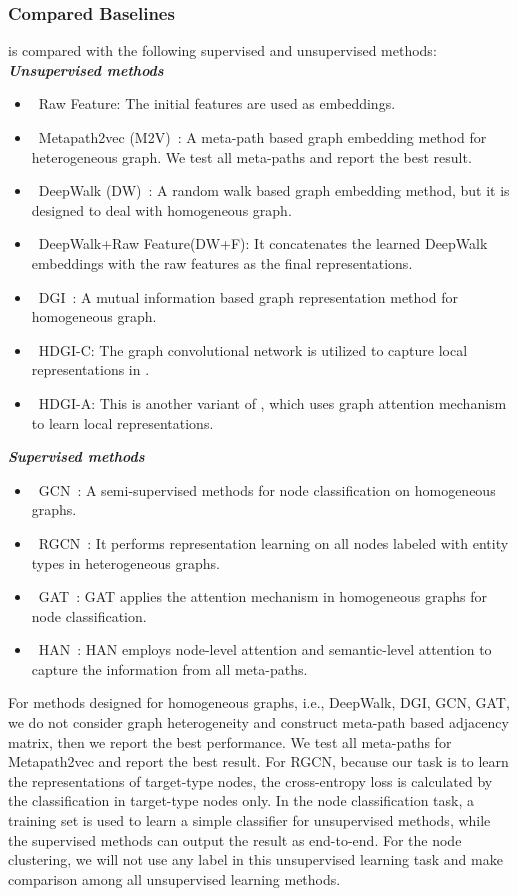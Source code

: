 \documentclass[conference]{IEEEtran}
\begin{document}
\subsubsection{Compared Baselines}
	{\our} is compared with the following supervised and unsupervised methods:\\
	\noindent
	\textbf{\textit{Unsupervised methods}}
	\begin{itemize}
\item~{Raw Feature}: The initial features are used as embeddings.
\item~{Metapath2vec (M2V)~\cite{DCS17}}: A meta-path based graph embedding method for heterogeneous graph. We test all meta-paths and report the best result.
\item~{DeepWalk (DW)~\cite{PAS14}}: A random walk based graph embedding method, but it is designed to deal with homogeneous graph. 
		\item~{DeepWalk+Raw Feature(DW+F)}: It concatenates the learned DeepWalk embeddings with the raw features as the final representations.
\item~{DGI~\cite{velivckovic2018deep}}: A mutual information based graph representation method for homogeneous graph.
\item~{HDGI-C}: The graph convolutional network is utilized to capture local representations in {\our}.
\item~{HDGI-A}: This is another variant of {\our}, which uses graph attention mechanism to learn local representations.
\end{itemize}
	\noindent
\textbf{\textit{Supervised methods}}
	\begin{itemize}
\item~{GCN~\cite{KW17}}: A semi-supervised methods for node classification on homogeneous graphs.
\item~{RGCN~\cite{schlichtkrull2018modeling}}: It performs representation learning on all nodes labeled with entity types in heterogeneous graphs.
\item~{GAT~\cite{VCCRLB18}}: GAT applies the attention mechanism in homogeneous graphs for node classification.
\item~{HAN~\cite{WJSWCYY19}}: HAN employs node-level attention and semantic-level attention to capture the information from all meta-paths.
\end{itemize}
	
	For methods designed for homogeneous graphs, i.e., DeepWalk, DGI, GCN, GAT, we do not consider graph heterogeneity and construct meta-path based adjacency matrix, then we report the best performance. We test all meta-paths for Metapath2vec and report the best result. For RGCN, because our task is to learn the representations of target-type nodes, the cross-entropy loss is calculated by the classification in target-type nodes only. In the node classification task, a training set is used to learn a simple classifier for unsupervised methods, while the supervised methods can output the result as end-to-end. For the node clustering, we will not use any label in this unsupervised learning task and make comparison among all unsupervised learning methods.
	
\end{document}
